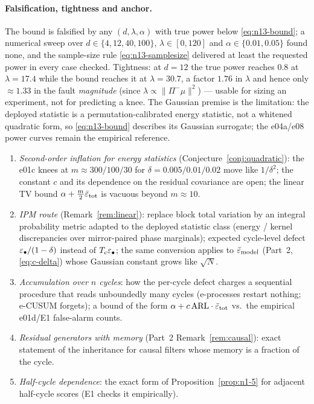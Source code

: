 \paragraph{Falsification, tightness and anchor.}
The bound is falsified by any $(d,\lambda,\alpha)$ with true power below
\eqref{eq:n13-bound}; a numerical sweep over $d \in \{4,12,40,100\}$,
$\lambda \in [0,120]$ and $\alpha \in \{0.01,0.05\}$ found none, and the
sample-size rule \eqref{eq:n13-samplesize} delivered at least the requested
power in every case checked. Tightness: at $d = 12$ the true power reaches
$0.8$ at $\lambda = 17.4$ while the bound reaches it at $\lambda = 30.7$, a
factor $1.76$ in $\lambda$ and hence only $\approx 1.33$ in the fault
\emph{magnitude} (since $\lambda \propto \|\Pi^-\mu\|^2$) --- usable for
sizing an experiment, not for predicting a knee. The Gaussian premise is the
limitation: the deployed statistic is a permutation-calibrated energy
statistic, not a whitened quadratic form, so \eqref{eq:n13-bound} describes
its Gaussian surrogate; the e04a/e08 power curves remain the empirical
reference.

\begin{enumerate}
\item \emph{Second-order inflation for energy statistics}
(Conjecture~\ref{conj:quadratic}): the e01c knees at $m \approx 300/100/30$
for $\delta = 0.005/0.01/0.02$ move like $1/\delta^2$; the constant $c$ and its
dependence on the residual covariance are open; the linear TV bound
$\alpha + \tfrac{m}{2}\bar\varepsilon_{\mathrm{tot}}$ is vacuous beyond $m \approx 10$.
\item \emph{IPM route} (Remark~\ref{rem:linear}): replace block total
variation by an integral probability metric adapted to the deployed
statistic class (energy / kernel discrepancies over mirror-paired phase
marginals); expected cycle-level defect $\varepsilon_{\mathrm{\bullet}}/(1-\delta)$ instead of
$T_{\mathrm{c}}\varepsilon_{\mathrm{\bullet}}$; the same conversion applies to $\bar\varepsilon_{\mathrm{model}}$
(Part~2, \eqref{eq:c-delta}) whose Gaussian constant grows like $\sqrt N$.
\item \emph{Accumulation over $n$ cycles}: how the per-cycle defect
charges a sequential procedure that reads unboundedly many cycles
(e-processes restart nothing; e-CUSUM forgets); a bound of the form
$\alpha + c\,\mathrm{ARL}\cdot\bar\varepsilon_{\mathrm{tot}}$ vs.\ the empirical e01d/E1
false-alarm counts.
\item \emph{Residual generators with memory} (Part~2 Remark~\ref{rem:causal}):
exact statement of the inheritance for causal filters whose memory is a
fraction of the cycle.
\item \emph{Half-cycle dependence}: the exact form of Proposition~\ref{prop:n1-5}
for adjacent half-cycle scores (E1 checks it empirically).
\end{enumerate}
